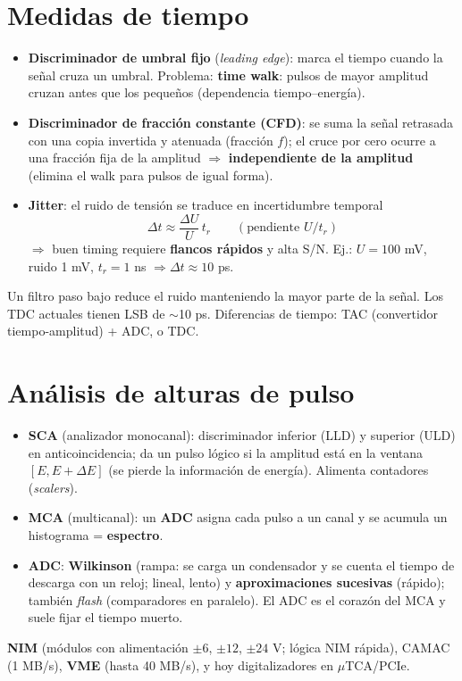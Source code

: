 \section{Medidas de tiempo}
\begin{clave}
\begin{itemize}
\item \textbf{Discriminador de umbral fijo} (\emph{leading edge}): marca el tiempo cuando la señal cruza un umbral.
Problema: \textbf{time walk}: pulsos de mayor amplitud cruzan antes que los pequeños (dependencia tiempo--energía).
\item \textbf{Discriminador de fracción constante (CFD)}: se suma la señal retrasada con una copia invertida y atenuada (fracción $f$);
el cruce por cero ocurre a una fracción fija de la amplitud $\Rightarrow$ \textbf{independiente de la amplitud} (elimina el walk para pulsos de igual forma).
\item \textbf{Jitter}: el ruido de tensión se traduce en incertidumbre temporal
\[ \Delta t\approx\frac{\Delta U}{U}\,t_r\qquad(\text{pendiente }U/t_r) \]
$\Rightarrow$ buen timing requiere \textbf{flancos rápidos} y alta S/N. Ej.: $U=100$ mV, ruido 1 mV, $t_r=1$ ns $\Rightarrow\Delta t\approx10$ ps.
\end{itemize}
\end{clave}
Un filtro paso bajo reduce el ruido manteniendo la mayor parte de la señal. Los TDC actuales tienen LSB de $\sim$10 ps.
Diferencias de tiempo: TAC (convertidor tiempo-amplitud) + ADC, o TDC.

\section{Análisis de alturas de pulso}
\begin{itemize}
\item \textbf{SCA} (analizador monocanal): discriminador inferior (LLD) y superior (ULD) en anticoincidencia; da un pulso lógico si la amplitud está
en la ventana $[E,E+\Delta E]$ (se pierde la información de energía). Alimenta contadores (\emph{scalers}).
\item \textbf{MCA} (multicanal): un \textbf{ADC} asigna cada pulso a un canal y se acumula un histograma = \textbf{espectro}.
\item \textbf{ADC}: \textbf{Wilkinson} (rampa: se carga un condensador y se cuenta el tiempo de descarga con un reloj; lineal, lento) y
\textbf{aproximaciones sucesivas} (rápido); también \emph{flash} (comparadores en paralelo). El ADC es el corazón del MCA y suele fijar el tiempo muerto.
\end{itemize}
\begin{dato}[Estándares]
\textbf{NIM} (módulos con alimentación $\pm6$, $\pm12$, $\pm24$ V; lógica NIM rápida), CAMAC (1 MB/s), \textbf{VME} (hasta 40 MB/s), y hoy digitalizadores en $\mu$TCA/PCIe.
\end{dato}

